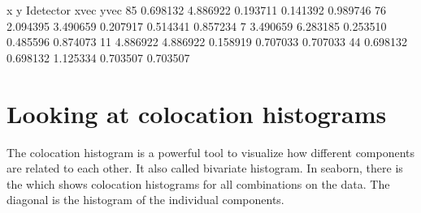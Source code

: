 \documentclass[letterpaper,10pt,english]{sphinxmanual}
\begin{document}
\begin{sphinxVerbatim}[commandchars=\\\{\}]
\PYG{p}{[}\PYG{p}{]}    \PYG{p}{[}\PYG{p}{]}\PYG{p}{[}\PYG{p}{]}\PYG{p}{[}\PYG{p}{]} 
\PYG{p}{[}\PYG{p}{]}    \PYG{p}{[}\PYG{p}{]}\PYG{p}{[}\PYG{p}{]}\PYG{p}{[}\PYG{p}{]} 

\end{sphinxVerbatim}

\begin{sphinxVerbatim}[commandchars=\\\{\}]
           x         y  I\PYGZus{}detector     x\PYGZus{}vec     y\PYGZus{}vec
85  0.698132  4.886922    0.193711  0.141392  0.989746
76  2.094395  3.490659    0.207917  0.514341  0.857234
7   3.490659 \PYGZhy{}6.283185    0.253510  0.485596 \PYGZhy{}0.874073
11 \PYGZhy{}4.886922 \PYGZhy{}4.886922   \PYGZhy{}0.158919 \PYGZhy{}0.707033 \PYGZhy{}0.707033
44 \PYGZhy{}0.698132 \PYGZhy{}0.698132    1.125334 \PYGZhy{}0.703507 \PYGZhy{}0.703507
\end{sphinxVerbatim}


\section{Looking at colocation histograms}
\label{\detokenize{04-BasicSegmentation:looking-at-colocation-histograms}}
\sphinxAtStartPar
The colocation histogram is a powerful tool to visualize how different components are related to each other. It also called bi\sphinxhyphen{}variate histogram. In seaborn, there is the  which shows colocation histograms for all combinations on the data. The diagonal is the histogram of the individual components.
\end{document}
